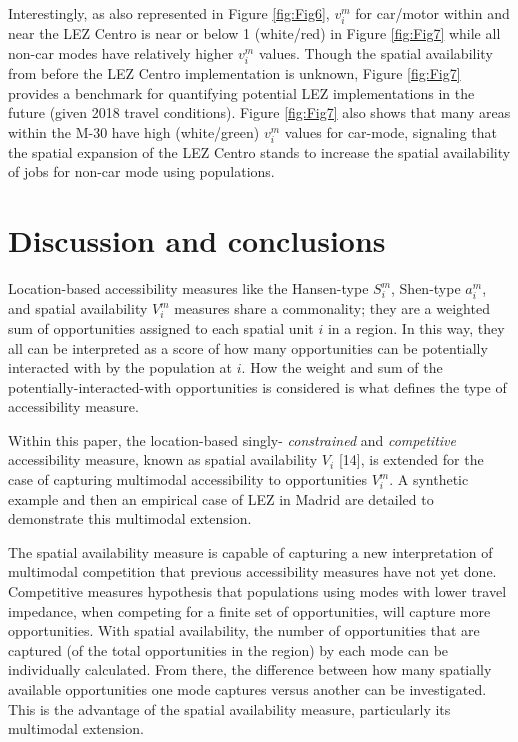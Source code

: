 \documentclass[10pt,letterpaper]{article}
\begin{document}
Interestingly, as also represented in Figure \ref{fig:Fig6}, \(v_i^m\)
for car/motor within and near the LEZ Centro is near or below 1
(white/red) in Figure \ref{fig:Fig7} while all non-car modes have
relatively higher \(v_i^m\) values. Though the spatial availability from
before the LEZ Centro implementation is unknown, Figure \ref{fig:Fig7}
provides a benchmark for quantifying potential LEZ implementations in
the future (given 2018 travel conditions). Figure \ref{fig:Fig7} also
shows that many areas within the M-30 have high (white/green) \(v_i^m\)
values for car-mode, signaling that the spatial expansion of the LEZ
Centro stands to increase the spatial availability of jobs for non-car
mode using populations.

\hypertarget{discussion-and-conclusions}{%
\section{Discussion and conclusions}\label{discussion-and-conclusions}}

Location-based accessibility measures like the Hansen-type \(S_i^m\),
Shen-type \(a_i^m\), and spatial availability \(V_i^m\) measures share a
commonality; they are a weighted sum of opportunities assigned to each
spatial unit \(i\) in a region. In this way, they all can be interpreted
as a score of how many opportunities can be potentially interacted with
by the population at \(i\). How the weight and sum of the
potentially-interacted-with opportunities is considered is what defines
the type of accessibility measure.

Within this paper, the location-based singly- \emph{constrained} and
\emph{competitive} accessibility measure, known as spatial availability
\(V_i\) {[}14{]}, is extended for the case of capturing multimodal
accessibility to opportunities \(V_i^m\). A synthetic example and then
an empirical case of LEZ in Madrid are detailed to demonstrate this
multimodal extension.

The spatial availability measure is capable of capturing a new
interpretation of multimodal competition that previous accessibility
measures have not yet done. Competitive measures hypothesis that
populations using modes with lower travel impedance, when competing for
a finite set of opportunities, will capture more opportunities. With
spatial availability, the number of opportunities that are captured (of
the total opportunities in the region) by each mode can be individually
calculated. From there, the difference between how many spatially
available opportunities one mode captures versus another can be
investigated. This is the advantage of the spatial availability measure,
particularly its multimodal extension.
\end{document}
